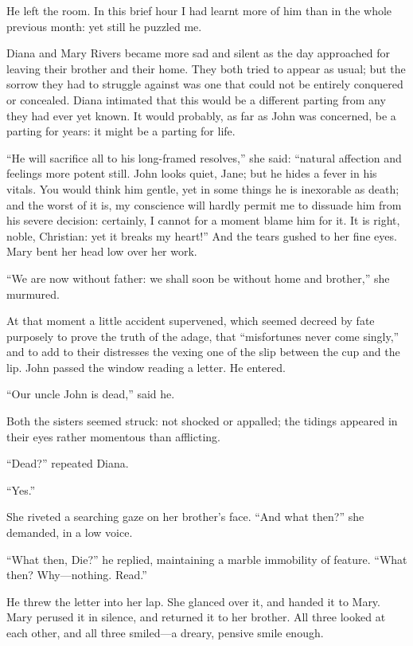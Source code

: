 He left the room. In this brief hour I had learnt more of him than in
the whole previous month: yet still he puzzled me.

Diana and Mary Rivers became more sad and silent as the day approached
for leaving their brother and their home. They both tried to appear as
usual; but the sorrow they had to struggle against was one that could
not be entirely conquered or concealed. Diana intimated that this would
be a different parting from any they had ever yet known. It would
probably, as far as \St{} John was concerned, be a parting for years: it
might be a parting for life.

\enquote{He will sacrifice all to his long-framed resolves,} she said:
\enquote{natural affection and feelings more potent still. \St{} John
looks quiet, Jane; but he hides a fever in his vitals. You would think
him gentle, yet in some things he is inexorable as death; and the worst
of it is, my conscience will hardly permit me to dissuade him from his
severe decision: certainly, I cannot for a moment blame him for it. It
is right, noble, Christian: yet it breaks my heart!} And the tears
gushed to her fine eyes. Mary bent her head low over her work.

\enquote{We are now without father: we shall soon be without home and
brother,} she murmured.

At that moment a little accident supervened, which seemed decreed by
fate purposely to prove the truth of the adage, that
\enquote{misfortunes never come singly,} and to add to their distresses
the vexing one of the slip between the cup and the lip. \St{} John passed
the window reading a letter. He entered.

\enquote{Our uncle John is dead,} said he.

Both the sisters seemed struck: not shocked or appalled; the tidings
appeared in their eyes rather momentous than afflicting.

\enquote{Dead?} repeated Diana.

\enquote{Yes.}

She riveted a searching gaze on her brother's face. \enquote{And what
then?} she demanded, in a low voice.

\enquote{What then, Die?} he replied, maintaining a marble immobility of
feature. \enquote{What then? Why---nothing. Read.}

He threw the letter into her lap. She glanced over it, and handed it to
Mary. Mary perused it in silence, and returned it to her brother. All
three looked at each other, and all three smiled---a dreary, pensive
smile enough.

